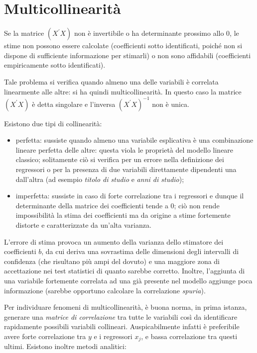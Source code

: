 \documentclass[a4page, 11pt]{article} %
\begin{document}
\section{Multicollinearità }
Se la matrice $(X^\prime X)$ non è invertibile o ha determinante prossimo allo 0, le stime non possono essere calcolate (coefficienti sotto identificati, poiché non si dispone di sufficiente informazione per stimarli) o non sono affidabili (coefficienti empiricamente sotto identificati).

Tale problema si verifica quando almeno una delle variabili è correlata linearmente alle altre: si ha quindi multicollinearità.
In questo caso la matrice $(X^\prime X)$ è detta singolare e l'inversa $(X^\prime X)^{-1}$ non è unica. 

Esistono due tipi di collinearità:
\begin{itemize}[noitemsep]
  \item perfetta: sussiste quando almeno una variabile esplicativa è una combinazione lineare perfetta delle altre: questa viola le proprietà del modello lineare classico; solitamente ciò si verifica per un errore nella definizione dei regressori o per la presenza di due variabili direttamente dipendenti una dall'altra (ad esempio \textit{titolo di studio} e \textit{anni di studio});
  \item imperfetta: sussiste in caso di forte correlazione tra i regressori e dunque il determinante della matrice dei coefficienti tende a $0$; ciò non rende impossibilità la stima dei coefficienti ma da origine a stime fortemente distorte e caratterizzate da un'alta varianza.
\end{itemize}

L'errore di stima provoca un aumento della varianza dello stimatore dei coefficienti $b$, da cui deriva una sovrastima delle dimensioni degli intervalli di confidenza (che risultano più ampi del dovuto) e una maggiore zona di accettazione nei test statistici di quanto sarebbe corretto.
Inoltre, l'aggiunta di una variabile fortemente correlata ad una già presente nel modello aggiunge poca informazione (sarebbe opportuno calcolare la correlazione \textit{spuria}).

Per individuare fenomeni di multicollinearità, è buona norma, in prima istanza, generare una \textit{matrice di correlazione} tra tutte le variabili così da identificare rapidamente possibili variabili collineari.
Auspicabilmente infatti è preferibile avere forte correlazione tra $y$ e i regressori $x_j$, e bassa correlazione tra questi ultimi.
Esistono inoltre metodi analitici:
\end{document}
